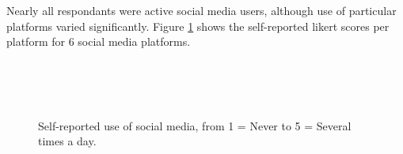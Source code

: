 \documentclass{sig-alternate}
\begin{document}
Nearly all respondants were active social media users, although use of particular platforms varied significantly.  Figure \ref{fig:socialmedia} shows the self-reported likert scores per platform for 6 social media platforms.

\begin{figure}[t!]
 	  \begin{center}
        \\ %
        \\ %
        \\ %
    \end{center}
    \caption{%
    	Self-reported use of social media, from 1 = Never to 5 = Several times a day.
     }%
   \label{fig:socialmedia}
\end{figure}
\end{document}
